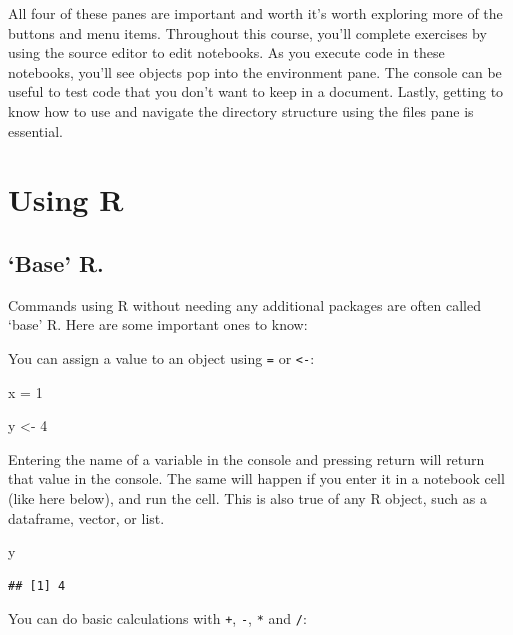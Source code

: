 \documentclass[
]{book}
\newenvironment{Shaded}{\begin{snugshade}}{\end{snugshade}}
\newcommand{\DecValTok}[1]{\textcolor[rgb]{0.00,0.00,0.81}{#1}}
\newcommand{\NormalTok}[1]{#1}
\newcommand{\OtherTok}[1]{\textcolor[rgb]{0.56,0.35,0.01}{#1}}
\begin{document}
All four of these panes are important and worth it's worth exploring more of the buttons and menu items. Throughout this course, you'll complete exercises by using the source editor to edit notebooks. As you execute code in these notebooks, you'll see objects pop into the environment pane. The console can be useful to test code that you don't want to keep in a document. Lastly, getting to know how to use and navigate the directory structure using the files pane is essential.

\hypertarget{using-r}{%
\section{Using R}\label{using-r}}

\hypertarget{base-r.}{%
\subsection{`Base' R.}\label{base-r.}}

Commands using R without needing any additional packages are often called `base' R. Here are some important ones to know:

You can assign a value to an object using \texttt{=} or \texttt{\textless{}-}:

\begin{Shaded}
\begin{Highlighting}[]
\NormalTok{x }\OtherTok{=} \DecValTok{1}

\NormalTok{y }\OtherTok{\textless{}{-}} \DecValTok{4}
\end{Highlighting}
\end{Shaded}

Entering the name of a variable in the console and pressing return will return that value in the console. The same will happen if you enter it in a notebook cell (like here below), and run the cell. This is also true of any R object, such as a dataframe, vector, or list.

\begin{Shaded}
\begin{Highlighting}[]
\NormalTok{y}
\end{Highlighting}
\end{Shaded}

\begin{verbatim}
## [1] 4
\end{verbatim}

You can do basic calculations with \texttt{+}, \texttt{-}, \texttt{*} and \texttt{/}:
\end{document}
